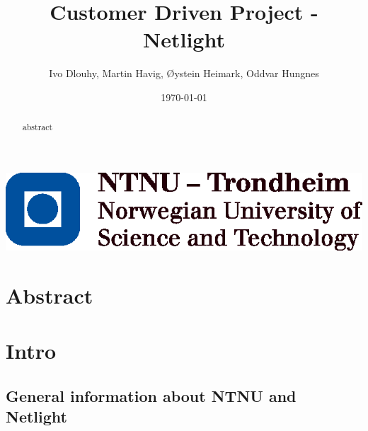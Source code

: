 \documentclass[10pt,a4paper,oneside]{report}
\begin{document}
\title{Customer Driven Project - Netlight}
\author{Ivo Dlouhy, Martin Havig, Øystein Heimark, Oddvar Hungnes}
\date{\today}
\maketitle

\includegraphics{logo-ntnu.eps}

\begin{abstract}
abstract
\end{abstract}

\setcounter{tocdepth}{4}
\tableofcontents
\clearpage
\listoffigures



\chapter{Abstract}

\chapter{Intro}
\section{General information about NTNU and Netlight}
\end{document}
